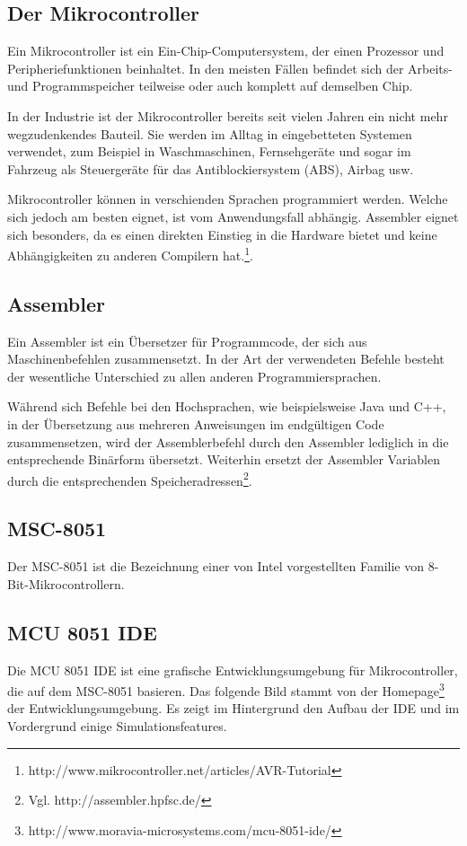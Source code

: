 \subsection{Der Mikrocontroller}
	Ein Mikrocontroller ist ein Ein-Chip-Computersystem, der einen Prozessor und Peripheriefunktionen beinhaltet. In den meisten Fällen befindet sich der Arbeits- und Programmspeicher teilweise oder auch komplett auf demselben Chip. 
	
	In der Industrie ist der Mikrocontroller bereits seit vielen Jahren ein nicht mehr wegzudenkendes Bauteil. Sie werden im Alltag in eingebetteten Systemen verwendet, zum Beispiel in Waschmaschinen, Fernsehgeräte und sogar im Fahrzeug als Steuergeräte für das Antiblockiersystem (ABS), Airbag usw.
	
	Mikrocontroller können in verschienden Sprachen programmiert werden. Welche sich jedoch am besten eignet, ist vom Anwendungsfall abhängig. Assembler eignet sich besonders, da es einen direkten Einstieg in die Hardware bietet und keine Abhängigkeiten zu anderen Compilern hat.\footnote{http://www.mikrocontroller.net/articles/AVR-Tutorial}. 
	
\subsection{Assembler}
	Ein Assembler ist ein Übersetzer für Programmcode, der sich aus Maschinenbefehlen zusammensetzt. In der Art der verwendeten Befehle besteht der wesentliche Unterschied zu allen anderen Programmiersprachen. 
	
	Während sich Befehle bei den Hochsprachen, wie beispielsweise Java und C++, in der Übersetzung aus mehreren Anweisungen im endgültigen Code zusammensetzen, wird der Assemblerbefehl durch den Assembler lediglich in die entsprechende Binärform übersetzt. Weiterhin ersetzt der Assembler Variablen durch die entsprechenden Speicheradressen\footnote{Vgl. http://assembler.hpfsc.de/}.
	
\subsection{MSC-8051}
	Der MSC-8051 ist die Bezeichnung einer von Intel vorgestellten Familie von 8-Bit-Mikrocontrollern.
	
	
	

\subsection{MCU 8051 IDE}
	Die MCU 8051 IDE ist eine grafische Entwicklungsumgebung für Mikrocontroller, die auf dem MSC-8051 basieren. Das folgende Bild stammt von der Homepage\footnote{http://www.moravia-microsystems.com/mcu-8051-ide/} der Entwicklungsumgebung. Es zeigt im Hintergrund den Aufbau der IDE und im Vordergrund einige Simulationsfeatures. 

